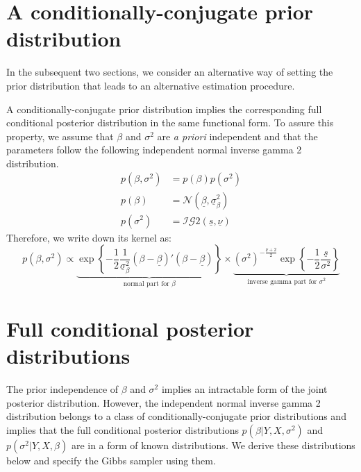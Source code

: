 \documentclass[
  letterpaper,
  DIV=11,
  numbers=noendperiod]{scrreprt}
\begin{document}
\hypertarget{a-conditionally-conjugate-prior-distribution}{%
\section{A conditionally-conjugate prior
distribution}\label{a-conditionally-conjugate-prior-distribution}}

In the subsequent two sections, we consider an alternative way of
setting the prior distribution that leads to an alternative estimation
procedure.

A conditionally-conjugate prior distribution implies the corresponding
full conditional posterior distribution in the same functional form. To
assure this property, we assume that \(\beta\) and \(\sigma^2\) are
\emph{a priori} independent and that the parameters follow the following
independent normal inverse gamma 2 distribution. \begin{align}
p\left(\beta, \sigma^2\right) &= p\left(\beta\right)p\left(\sigma^2\right)\\[1ex]
p\left(\beta\right)&=\mathcal{N}\left( \underline{\beta}, \underline{\sigma}_{\beta}^2 \right)\\
p\left(\sigma^2\right)&=\mathcal{IG}2(\underline{s},\underline{\nu})
\end{align} Therefore, we write down its kernel as: \begin{equation} 
p\left(\beta, \sigma^2\right) \propto 
\underbrace{\exp\left\{ -\frac{1}{2}\frac{1}{\underline{\sigma}_{\beta}^2}(\beta-\underline{\beta})'(\beta-\underline{\beta}) \right\}}_{\text{normal part for }\beta} 
\times 
\underbrace{\left(\sigma^2\right)^{-\frac{\underline{\nu}+2}{2}}
\exp\left\{ -\frac{1}{2}\frac{\underline{s}}{\sigma^2} \right\}}_{\text{inverse gamma part for }\sigma^2}
\end{equation}

\hypertarget{full-conditional-posterior-distributions}{%
\section{Full conditional posterior
distributions}\label{full-conditional-posterior-distributions}}

The prior independence of \(\beta\) and \(\sigma^2\) implies an
intractable form of the joint posterior distribution. However, the
independent normal inverse gamma 2 distribution belongs to a class of
conditionally-conjugate prior distributions and implies that the full
conditional posterior distributions \(p\left(\beta|Y,X,\sigma^2\right)\)
and \(p\left(\sigma^2|Y,X,\beta\right)\) are in a form of known
distributions. We derive these distributions below and specify the Gibbs
sampler using them.
\end{document}
